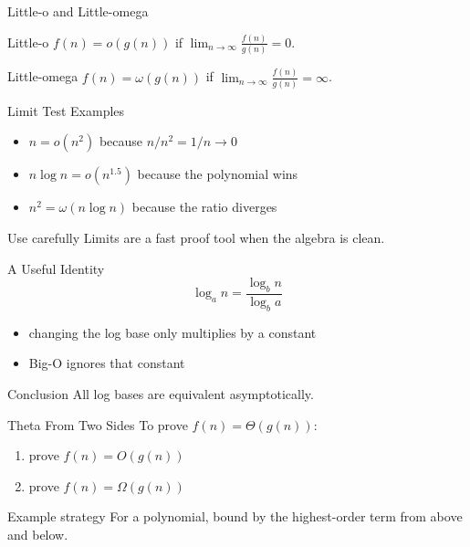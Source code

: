 \documentclass[aspectratio=169,xcolor=dvipsnames]{beamer}
\begin{document}
\begin{frame}{Little-o and Little-omega}
  \begin{block}{Little-o}
    $f(n) = o(g(n))$ if $\lim_{n \to \infty} \frac{f(n)}{g(n)} = 0$.
  \end{block}
  \begin{block}{Little-omega}
    $f(n) = \omega(g(n))$ if $\lim_{n \to \infty} \frac{f(n)}{g(n)} = \infty$.
  \end{block}
\end{frame}

\begin{frame}{Limit Test Examples}
  \begin{itemize}
    \item $n = o(n^2)$ because $n/n^2 = 1/n \to 0$
    \item $n \log n = o(n^{1.5})$ because the polynomial wins
    \item $n^2 = \omega(n \log n)$ because the ratio diverges
  \end{itemize}
  \begin{block}{Use carefully}
    Limits are a fast proof tool when the algebra is clean.
  \end{block}
\end{frame}

\begin{frame}{A Useful Identity}
  \[
    \log_a n = \frac{\log_b n}{\log_b a}
  \]
  \begin{itemize}
    \item changing the log base only multiplies by a constant
    \item Big-O ignores that constant
  \end{itemize}
  \begin{exampleblock}{Conclusion}
    All log bases are equivalent asymptotically.
  \end{exampleblock}
\end{frame}

\begin{frame}{Theta From Two Sides}
  To prove $f(n)=\Theta(g(n))$:
  \begin{enumerate}
    \item prove $f(n)=O(g(n))$
    \item prove $f(n)=\Omega(g(n))$
  \end{enumerate}
  \begin{block}{Example strategy}
    For a polynomial, bound by the highest-order term from above and below.
  \end{block}
\end{frame}
\end{document}
